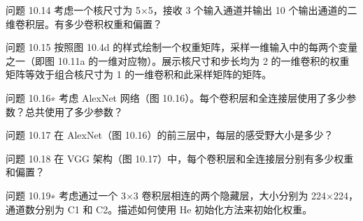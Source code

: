 问题 10.14 考虑一个核尺寸为 5×5，接收 3 个输入通道并输出 10 个输出通道的二维卷积层。有多少卷积权重和偏置？

问题 10.15 按照图 10.4d 的样式绘制一个权重矩阵，采样一维输入中的每两个变量之一（即图 10.11a 的一维对应物）。展示核尺寸和步长均为 2 的一维卷积的权重矩阵等效于组合核尺寸为 1 的一维卷积和此采样矩阵的矩阵。

问题 10.16∗ 考虑 AlexNet 网络（图 10.16）。每个卷积层和全连接层使用了多少参数？总共使用了多少参数？

问题 10.17 在 AlexNet（图 10.16）的前三层中，每层的感受野大小是多少？

问题 10.18 在 VGG 架构（图 10.17）中，每个卷积层和全连接层分别有多少权重和偏置？

问题 10.19∗ 考虑通过一个 3×3 卷积层相连的两个隐藏层，大小分别为 224×224，通道数分别为 C1 和 C2。描述如何使用 He 初始化方法来初始化权重。